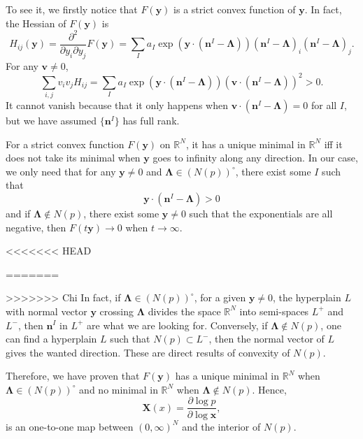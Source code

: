 \documentclass[12pt]{article}
\theoremstyle{definition}
\theoremstyle{plain}
\begin{document}
To see it, we firstly notice that $F(\mathbf y)$ is a strict convex function of $\mathbf y$. In fact, the Hessian of $F(\mathbf y)$ is 
\[
	H_{ij}(\mathbf y)=\frac{\partial^2}{\partial y_i\partial y_j}F(\mathbf y)=\sum_I a_I \exp\left(\mathbf{y}\cdot \left(\mathbf{n}^I-\mathbf{\Lambda}\right)\right)\left(\mathbf{n}^I-\mathbf{\Lambda}\right)_i\left(\mathbf{n}^I-\mathbf{\Lambda}\right)_j.
\]
For any $\mathbf v\neq 0$, 
\[
	\sum_{i,j}v_iv_jH_{ij}=\sum_I a_I \exp\left(\mathbf{y}\cdot \left(\mathbf{n}^I-\mathbf{\Lambda}\right)\right) \left(\mathbf v\cdot (\mathbf{n}^I-\mathbf{\Lambda})\right)^2 >0.
\]
It cannot vanish because that it only happens when $\mathbf v\cdot (\mathbf{n}^I-\mathbf{\Lambda})=0$ for all $I$, but we have assumed $\{\mathbf n^I\}$ has full rank.

For a strict convex function $F(\mathbf y)$ on $\mathbb R^N$, it has a unique minimal in $\mathbb R^N$ iff it does not take its minimal when $\mathbf{y}$ goes to infinity along any direction. In our case, we only need that for any $\mathbf{y}\neq 0$ and $\mathbf\Lambda \in (N(p))^\circ $, there exist some $I$ such that  
\[
	\mathbf{y}\cdot (\mathbf{n}^I-\mathbf{\Lambda})>0
\]
and if $\mathbf\Lambda \not\in N(p)$, there exist some $\mathbf{y}\neq 0$ such that the exponentials are all negative, then $F(t\mathbf y)\to 0$ when $t\to \infty$.

<<<<<<< HEAD

=======
\iffalse
\begin{center}
	\texttt{[image: 1.png]}
\end{center}
\fi
>>>>>>> Chi
In fact, if $\mathbf\Lambda \in (N(p))^\circ$, for a given $\mathbf y\neq 0$, the hyperplain $L$ with normal vector $\mathbf y$ crossing $\mathbf \Lambda$ divides the space $\mathbb R^N$ into semi-spaces $L^+$ and $L^-$, then $\mathbf{n}^I$ in $L^+$ are what we are looking for. Conversely, if $\mathbf\Lambda \not\in N(p)$, one can find a hyperplain $L$ such that $N(p)\subset L^-$, then the normal vector of $L$ gives the wanted direction. These are direct results of convexity of $N(p)$.

Therefore, we have proven that $F(\mathbf y)$ has a unique minimal in $\mathbb R^N$ when $\mathbf \Lambda \in (N(p))^\circ$ and no minimal in $\mathbb R^N$ when $\mathbf \Lambda \not\in N(p)$. Hence, 
\[
	\mathbf X(x)=\frac{\partial \log p}{\partial \log \mathbf x},
\]
is an one-to-one map between $(0,\infty)^N$ and the interior of $N(p)$.
\end{document}

